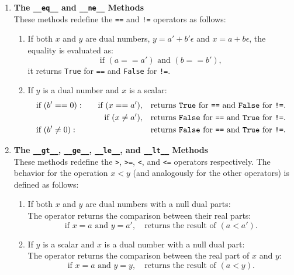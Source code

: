 \documentclass[a4paper,12pt]{article}
\begin{document}
\begin{itemize}
\begin{enumerate}
    \item \textbf{The \texttt{\_\_eq\_\_} and \texttt{\_\_ne\_\_} Methods} \\
    These methods redefine the \texttt{==} and \texttt{!=} operators as follows:
    \begin{enumerate}
        \item If both \(x\) and \(y\) are dual numbers, \(y = a' + b'\epsilon\) and \(x = a + b\epsilon\), the equality is evaluated as:
        \[
        \text{if } (a == a') \text{ and } (b == b'),
        \]
        it returns \texttt{True} for \texttt{==} and \texttt{False} for \texttt{!=}.
        \item If \(y\) is a dual number and \(x\) is a scalar:
        \[
        \begin{aligned}
            &\text{if } (b' == 0): &\quad \text{if } (x == a'), &\quad \text{returns \texttt{True} for \texttt{==} and \texttt{False} for \texttt{!=}}. \\
            &                      &\quad \text{if } (x \neq a'), &\quad \text{returns \texttt{False} for \texttt{==} and \texttt{True} for \texttt{!=}}. \\
            &\text{if } (b' \neq 0): &\quad &\quad \text{returns \texttt{False} for \texttt{==} and \texttt{True} for \texttt{!=}}. \\
        \end{aligned}
        \]
    \end{enumerate}
    
    \item \textbf{The \texttt{\_\_gt\_\_}, \texttt{\_\_ge\_\_}, \texttt{\_\_le\_\_}, and \texttt{\_\_lt\_\_} Methods} \\
These methods redefine the \texttt{>}, \texttt{>=}, \texttt{<}, and \texttt{<=} operators respectively. The behavior for the operation \(x < y\) (and analogously for the other operators) is defined as follows:

\begin{enumerate}
    \item If both \(x\) and \(y\) are dual numbers with a null dual parts: \\
    The operator returns the comparison between their real parts:
    \[
    \text{if } x = a \text{ and } y = a', \quad \text{returns the result of } (a < a').
    \]

    \item If \(y\) is a scalar and \(x\) is a dual number with a null dual part: \\
    The operator returns the comparison between the real part of \(x\) and \(y\):
    \[
    \text{if } x = a \text{ and } y = y, \quad \text{returns the result of } (a < y).
    \]


\end{enumerate}
\end{enumerate}
\end{itemize}
\end{document}
